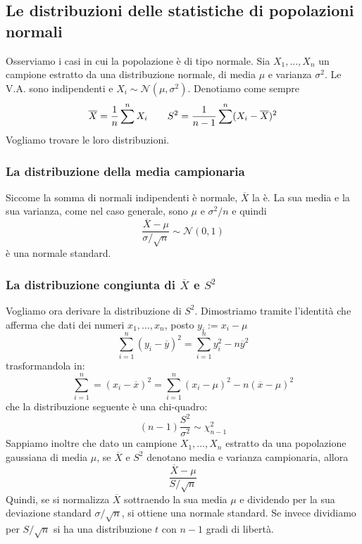 \documentclass[11pt]{article}
\begin{document}
\subsection{Le distribuzioni delle statistiche di popolazioni normali}
Osserviamo i casi in cui la popolazione è di tipo normale. Sia $X_1,...,X_n$ un campione estratto da una distribuzione normale, di media $\mu$ e varianza $\sigma^2$. Le V.A. sono indipendenti e $X_i \sim \mathcal{N}(\mu,\sigma^2)$. Denotiamo come sempre 
\begin{displaymath}
    \overline{X} = \frac{1}{n}\sum^n X_i \hspace{20px}S^2=\frac{1}{n-1}\sum^n(X_i-\overline{X})^2
\end{displaymath}
Vogliamo trovare le loro distribuzioni.
\subsubsection{La distribuzione della media campionaria}
Siccome la somma di normali indipendenti è normale, $\overline{X}$ la è. La sua media e la sua varianza, come nel caso generale, sono $\mu$ e $\sigma^2/n$ e quindi
\begin{displaymath}
    \frac{\overline{X}-\mu}{\sigma/\sqrt{n}}\sim \mathcal{N}(0,1)
\end{displaymath}
è una normale standard.
\subsubsection{La distribuzione congiunta di $\overline{X}$ e $S^2$}
Vogliamo ora derivare la distribuzione di $S^2$. Dimostriamo tramite l'identità che afferma che dati dei numeri $x_1,...,x_n$, posto $y_i:=x_i-\mu$
\begin{displaymath}
    \sum_{i=1}^n(y_i-\overline{y})^2=\sum_{i=1}^n y_i^2 - n\overline{y}^2
\end{displaymath} 
trasformandola in:
\begin{displaymath}
    \sum_{i=1}^n=(x_i-\overline{x})^2 = \sum_{i=1}^n(x_i-\mu)^2-n(\overline{x}-\mu)^2
\end{displaymath}
che la distribuzione seguente è una chi-quadro:
\begin{displaymath}
    (n-1)\frac{S^2}{\sigma^2} \sim \chi_{n-1}^2
\end{displaymath} 
Sappiamo inoltre che dato un campione $X_1,...,X_n$ estratto da una popolazione gaussiana di media $\mu$, se $\overline{X}$ e $S^2$ denotano media e varianza campionaria, allora
\begin{displaymath}
    \frac{\overline{X}-\mu}{S/\sqrt{n}}
\end{displaymath}
Quindi, se si normalizza $\overline{X}$ sottraendo la sua media $\mu$ e dividendo per la sua deviazione standard $\sigma/\sqrt{n}$, si ottiene una normale standard. Se invece dividiamo per $S/\sqrt{n}$ si ha una distribuzione $t$ con $n-1$ gradi di libertà.
\end{document}
